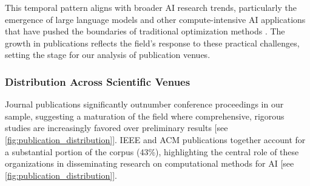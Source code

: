 \documentclass[acmsmall]{acmart}
\begin{document}
This temporal pattern aligns with broader AI research trends, particularly the emergence of large language models and other compute-intensive AI applications that have pushed the boundaries of traditional optimization methods \citep{ataei2024filtering}. The growth in publications reflects the field's response to these practical challenges, setting the stage for our analysis of publication venues.

\subsubsection{Distribution Across Scientific Venues}\label{subsubsec:overview-of-included-studies:distribution-across-scientific-venues}
Journal publications significantly outnumber conference proceedings in our sample, suggesting a maturation of the field where comprehensive, rigorous studies are increasingly favored over preliminary results [see \cref{fig:publication_distribution}]. IEEE and ACM publications together account for a substantial portion of the corpus (43\%), highlighting the central role of these organizations in disseminating research on computational methods for AI [see \cref{fig:publication_distribution}].
\end{document}
